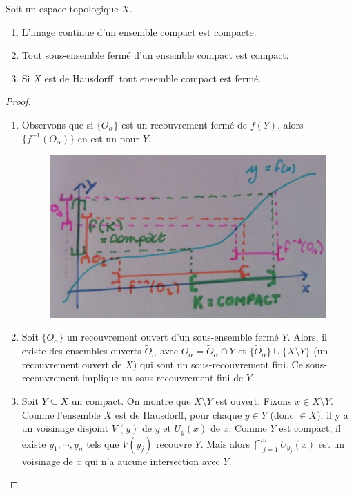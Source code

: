 \begin{theo}
    Soit un espace topologique $X$.
    \begin{enumerate}[label=(\roman*)]
        \item L'image continue d'un ensemble compact est compacte.
        \item Tout sous-ensemble fermé d'un ensemble compact est compact.
        \item Si $X$ est de Hausdorff, tout ensemble compact est fermé.
    \end{enumerate}
\end{theo}

\begin{proof}
    \begin{enumerate}
        \item Observons que si $\{O_\alpha\}$ est un recouvrement fermé de $f(Y)$, alors $\{f^{-1}(O_\alpha)\}$ en est un pour $Y$.
        \begin{figure}[H]
            \centering
            \includegraphics[scale = 0.2]{synthese_compact.jpg}
        \end{figure}
        \item Soit $\{O_\alpha\}$ un recouvrement ouvert d'un sous-ensemble fermé $Y$. Alors, il existe des ensembles ouverts $\tilde{O}_\alpha$ avec $O_\alpha = \tilde{O}_\alpha\cap Y$ et $\{\tilde{O}_\alpha\}\cup\{X\setminus Y\}$ (un recouvrement ouvert de $X$) qui sont un sous-recouvrement fini. Ce sous-recouvrement implique un sous-recouvrement fini de $Y$.
        \item Soit $Y\subseteq X$ un compact. On montre que $X\setminus Y$ est ouvert. Fixons $x\in X\setminus Y$. Comme l'ensemble $X$ est de Hausdorff, pour chaque $y\in Y$ (donc $\in X$), il y a un voisinage disjoint $V(y)$ de $y$ et $U_y(x)$ de $x$. Comme $Y$ est compact, il existe $y_1,\cdots,y_n$ tels que $V(y_j)$ recouvre $Y$. Mais alors $\bigcap_{j=1}^n U_{y_j}(x)$ est un voisinage de $x$ qui n'a aucune intersection avec $Y$.
    \end{enumerate}
\end{proof}

